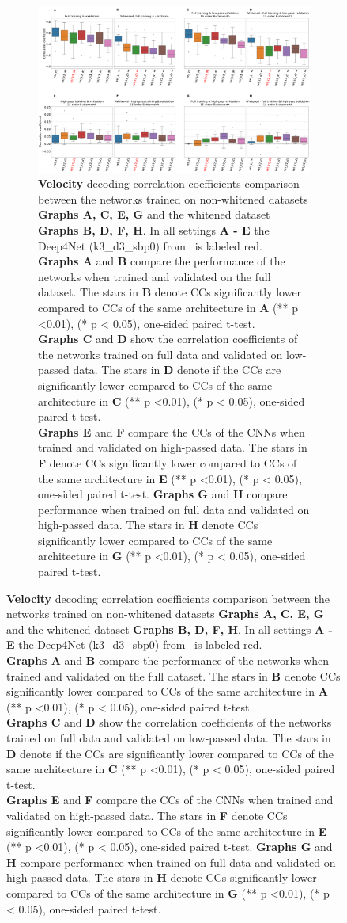\begin{figure}[!htbp]
\begin{subfigure}[a]{\textwidth}
   \includegraphics[width=1\linewidth]{img/ch4/vel-pw-vs-non-pw-performance}
   \caption{\textbf{Velocity} decoding correlation coefficients comparison between the networks trained on non-whitened datasets \textbf{Graphs A, C, E, G} and the whitened dataset \textbf{Graphs B, D, F, H}.
   In all settings \textbf{A - E} the Deep4Net (k3\_d3\_sbp0) from~\cite{Hammer-2021} is labeled red.
   \\ \textbf{Graphs A} and \textbf{B} compare the performance of the networks when trained and validated on the full dataset.
   The stars in \textbf{B} denote CCs significantly lower compared to CCs of the same architecture in \textbf{A} (** p <0.01), (* p < 0.05), one-sided paired t-test.
   \\\textbf{Graphs C} and \textbf{D} show the correlation coefficients of the networks trained on full data and validated on low-passed data.
   The stars in \textbf{D} denote if the CCs are significantly lower compared to CCs of the same architecture in \textbf{C} (** p <0.01), (* p < 0.05), one-sided paired t-test.
   \\\textbf{Graphs E} and \textbf{F} compare the CCs of the CNNs when trained and validated on high-passed data.
   The stars in \textbf{F} denote CCs significantly lower compared to CCs of the same architecture in \textbf{E} (** p <0.01), (* p < 0.05), one-sided paired t-test.
   \textbf{Graphs G} and \textbf{H} compare performance when trained on full data and validated on high-passed data.
   The stars in \textbf{H} denote CCs significantly lower compared to CCs of the same architecture in \textbf{G} (** p <0.01), (* p < 0.05), one-sided paired t-test.}
   \label{fig:vel-pw-performance}
\end{subfigure}
\end{figure}
\clearpage   

